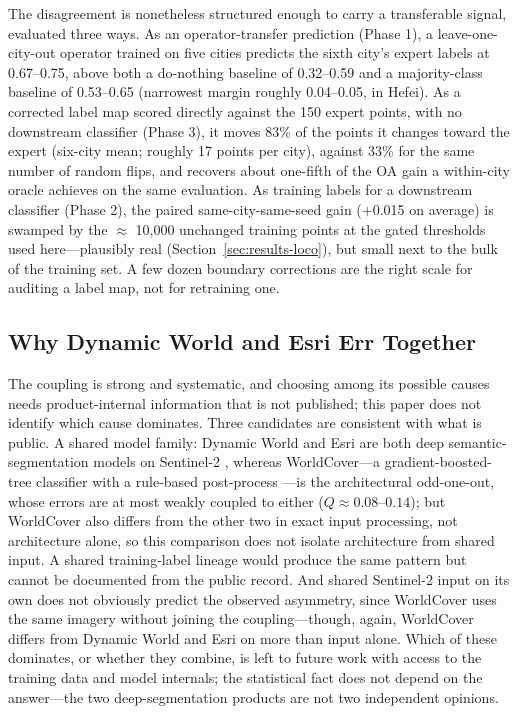 \documentclass[remotesensing,article,submit,moreauthors]{Definitions/mdpi}
\begin{document}
The disagreement is nonetheless structured enough to carry a transferable
signal\label{sec:disc-loco}, evaluated three ways. As an operator-transfer
prediction (Phase 1), a leave-one-city-out operator trained on five
cities predicts the sixth city's expert labels at 0.67--0.75, above both a
do-nothing baseline of 0.32--0.59 and a majority-class baseline of 0.53--0.65
(narrowest margin roughly 0.04--0.05, in Hefei). As a corrected label map
scored directly against the 150 expert points, with no downstream classifier
(Phase 3), it moves 83\% of the points it changes toward the expert (six-city
mean; roughly 17 points per city), against 33\% for the same number of random
flips, and recovers about one-fifth of the OA gain a within-city oracle
achieves on the same evaluation. As training labels for a downstream
classifier (Phase 2), the paired same-city-same-seed gain ($+$0.015 on
average) is swamped by the $\approx$ 10,000 unchanged training points at the
gated thresholds used here---plausibly real (Section~\ref{sec:results-loco}),
but small next to the bulk of the training set. A few dozen boundary
corrections are the right scale for auditing a label map, not for
retraining one.

\subsection{Why Dynamic World and Esri Err Together}\label{sec:disc-mechanism}

The coupling is strong and systematic, and choosing among its possible causes
needs product-internal information that is not published; this paper does not
identify which cause dominates. Three candidates are consistent with what is
public. A shared model family: Dynamic World and Esri are both deep
semantic-segmentation models on Sentinel-2 \citep{brown2022,karra2021}, whereas
WorldCover---a gradient-boosted-tree classifier with a rule-based post-process
\citep{zanaga2022}---is the architectural odd-one-out, whose errors are at most
weakly coupled to either ($Q \approx 0.08$--$0.14$); but WorldCover also differs from the
other two in exact input processing, not architecture alone, so this
comparison does not isolate architecture from shared input. A shared
training-label lineage would produce the same pattern but cannot be
documented from the public record. And shared Sentinel-2 input on its own
does not obviously predict the observed asymmetry, since WorldCover uses the
same imagery without joining the coupling---though, again, WorldCover differs
from Dynamic World and Esri on more than input alone. Which of these
dominates, or whether they combine, is left to future work with access to the
training data and model internals; the statistical fact does not depend on
the answer---the two deep-segmentation products are not two independent
opinions.
\end{document}
